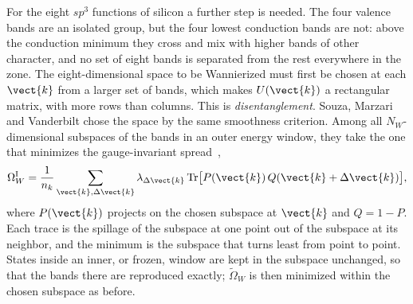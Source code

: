 For the eight $sp^3$ functions of silicon a further step is needed. The four valence bands are an isolated group, but the four lowest conduction bands are not: above the conduction minimum they cross and mix with higher bands of other character, and no set of eight bands is separated from the rest everywhere in the zone. The eight-dimensional space to be Wannierized must first be chosen at each $\vect{k}$ from a larger set of bands, which makes $U(\vect{k})$ a rectangular matrix, with more rows than columns. This is \emph{disentanglement}. Souza, Marzari and Vanderbilt chose the space by the same smoothness criterion. Among all $N_W$-dimensional subspaces of the bands in an outer energy window, they take the one that minimizes the gauge-invariant spread~\cite[Eqs.~(8) and (9)]{souza2001maximally},
\begin{equation}
  \Omega_W^{\mathrm{I}} = \frac{1}{n_k}\sum_{\vect{k},\Delta\vect{k}}\lambda_{\Delta\vect{k}}\,\mathrm{Tr}\bigl[P(\vect{k})\,Q(\vect{k} + \Delta\vect{k})\bigr],
  \label{eq:3.6-spillage}
\end{equation}
where $P(\vect{k})$ projects on the chosen subspace at $\vect{k}$ and $Q = 1 - P$. Each trace is the spillage of the subspace at one point out of the subspace at its neighbor, and the minimum is the subspace that turns least from point to point. States inside an inner, or frozen, window are kept in the subspace unchanged, so that the bands there are reproduced exactly; $\tilde\Omega_W$ is then minimized within the chosen subspace as before. 

